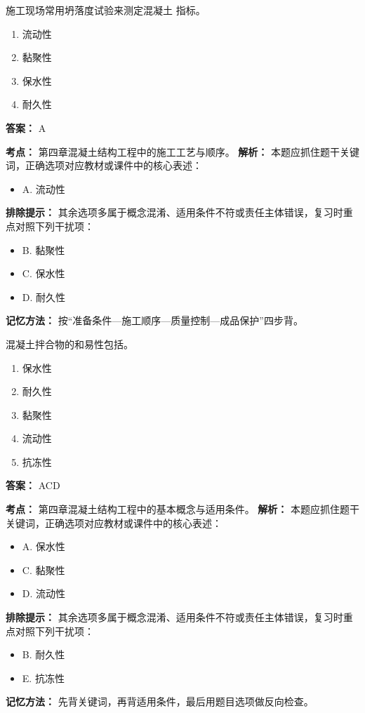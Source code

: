 \documentclass[UTF8,fontset=fandol,11pt]{ctexart}
\begin{document}
\begin{quizbox}[title={第 56 题}]
施工现场常用坍落度试验来测定混凝土 指标。\\
\begin{enumerate}[label=\Alph*.]
\item 流动性
\item 黏聚性
\item 保水性
\item 耐久性
\end{enumerate}
\textbf{答案：} A
\vspace{0.25em}
\begin{answerbox}[title={考点解析}]
\textbf{考点：} 第四章混凝土结构工程中的施工工艺与顺序。
\textbf{解析：} 本题应抓住题干关键词，正确选项对应教材或课件中的核心表述：
\begin{itemize}
\item A. 流动性
\end{itemize}
\textbf{排除提示：} 其余选项多属于概念混淆、适用条件不符或责任主体错误，复习时重点对照下列干扰项：
\begin{itemize}
\item B. 黏聚性
\item C. 保水性
\item D. 耐久性
\end{itemize}
\textbf{记忆方法：} 按“准备条件—施工顺序—质量控制—成品保护”四步背。
\end{answerbox}
\end{quizbox}

\begin{quizbox}[title={第 57 题}]
混凝土拌合物的和易性包括。\\
\begin{enumerate}[label=\Alph*.]
\item 保水性
\item 耐久性
\item 黏聚性
\item 流动性
\item 抗冻性
\end{enumerate}
\textbf{答案：} ACD
\vspace{0.25em}
\begin{answerbox}[title={考点解析}]
\textbf{考点：} 第四章混凝土结构工程中的基本概念与适用条件。
\textbf{解析：} 本题应抓住题干关键词，正确选项对应教材或课件中的核心表述：
\begin{itemize}
\item A. 保水性
\item C. 黏聚性
\item D. 流动性
\end{itemize}
\textbf{排除提示：} 其余选项多属于概念混淆、适用条件不符或责任主体错误，复习时重点对照下列干扰项：
\begin{itemize}
\item B. 耐久性
\item E. 抗冻性
\end{itemize}
\textbf{记忆方法：} 先背关键词，再背适用条件，最后用题目选项做反向检查。
\end{answerbox}
\end{quizbox}
\end{document}
